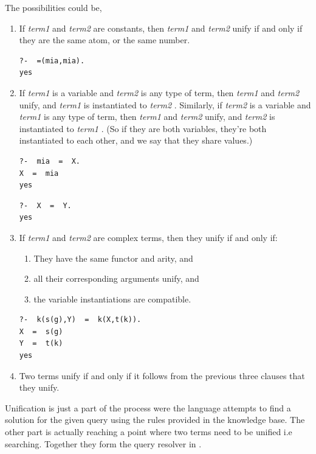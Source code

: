 \documentclass[thesis-solanki.tex]{subfiles}
\providecommand\metaSyntacticVariable[1]{\textsl{\ttfamily #1}}
\providecommand\mSV{\metaSyntacticVariable}
\begin{document}
The possibilities could be,
\begin{enumerate}
\item If \mSV{term1} and \mSV{term2} are constants, then \mSV{term1} and \mSV{term2} unify if and only if they
  are the same atom, or the same number.
\begin{verbatim}
?-  =(mia,mia).
yes
\end{verbatim}

\item If \mSV{term1} is a variable and \mSV{term2} is any type of term, then \mSV{term1} and \mSV{term2} unify, and \mSV{term1} is instantiated to \mSV{term2} . Similarly, if
\mSV{term2} is a variable and \mSV{term1} is any type of term, then \mSV{term1} and \mSV{term2} unify, and \mSV{term2} is instantiated to \mSV{term1} . (So if they are both
variables, they’re both instantiated to each other, and we say that they share values.)
\begin{verbatim}
?-  mia  =  X.
X  =  mia
yes
\end{verbatim}

\begin{verbatim}
?-  X  =  Y.
yes
\end{verbatim}

\item If \mSV{term1} and \mSV{term2} are complex terms, then they unify if and only if:

\begin{enumerate}
\item They have the same functor and arity, and

\item all their corresponding arguments unify, and

\item the variable instantiations are compatible.
\end{enumerate}
\begin{verbatim}
?-  k(s(g),Y)  =  k(X,t(k)).
X  =  s(g)
Y  =  t(k)
yes
\end{verbatim}


\item Two terms unify if and only if it follows from the previous three clauses that they unify.
\end{enumerate}

Unification is just a part of the process were the language attempts to find a solution for the given query using the rules provided in the
knowledge base. The other part is actually reaching a point where two terms need to be unified i.e searching. Together they form the query
resolver in .
\end{document}
